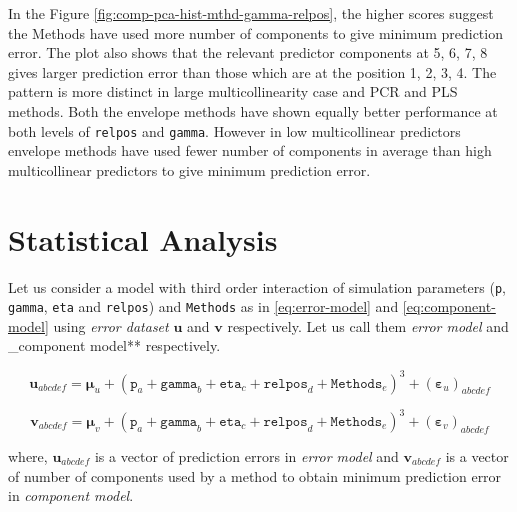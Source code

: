 \documentclass[12pt,3p,authoryear]{elsarticle}
\providecommand{\tightlist}{%
  \setlength{\itemsep}{0pt}\setlength{\parskip}{0pt}}
\begin{document}
In the Figure \ref{fig:comp-pca-hist-mthd-gamma-relpos}, the higher
scores suggest the Methods have used more number of components to give
minimum prediction error. The plot also shows that the relevant
predictor components at 5, 6, 7, 8 gives larger prediction error than
those which are at the position 1, 2, 3, 4. The pattern is more distinct
in large multicollinearity case and PCR and PLS methods. Both the
envelope methods have shown equally better performance at both levels of
\texttt{relpos} and \texttt{gamma}. However in low multicollinear
predictors envelope methods have used fewer number of components in
average than high multicollinear predictors to give minimum prediction
error.

\hypertarget{statistical-analysis}{%
\section{Statistical Analysis}\label{statistical-analysis}}

Let us consider a model with third order interaction of simulation
parameters (\texttt{p}, \texttt{gamma}, \texttt{eta} and
\texttt{relpos}) and \texttt{Methods} as in \eqref{eq:error-model} and
\eqref{eq:component-model} using \emph{error dataset} \(\mathbf{u}\) and
\(\mathbf{v}\) respectively. Let us call them \emph{error model} and
\_component model** respectively.

\begin{description}
\tightlist
\item[\textbf{Error Model:}]
\begin{equation}\mathbf{u}_{abcdef} = \boldsymbol{\mu}_u +
  (\texttt{p}_a + \texttt{gamma}_b + \texttt{eta}_c +
\texttt{relpos}_d + \texttt{Methods}_e)^3 +
  \left(\boldsymbol{\varepsilon}_u\right)_{abcdef}
  \label{eq:error-model}
  \end{equation}
\item[\textbf{Component Model:}]
\begin{equation}\mathbf{v}_{abcdef} = \boldsymbol{\mu}_v +
  (\texttt{p}_a + \texttt{gamma}_b + \texttt{eta}_c +
\texttt{relpos}_d + \texttt{Methods}_e)^3 +
  \left(\boldsymbol{\varepsilon}_v\right)_{abcdef}
  \label{eq:component-model}
  \end{equation}
\end{description}

where, \(\mathbf{u}_{abcdef}\) is a vector of prediction errors in
\emph{error model} and \(\mathbf{v}_{abcdef}\) is a vector of number of
components used by a method to obtain minimum prediction error in
\emph{component model}.
\end{document}
